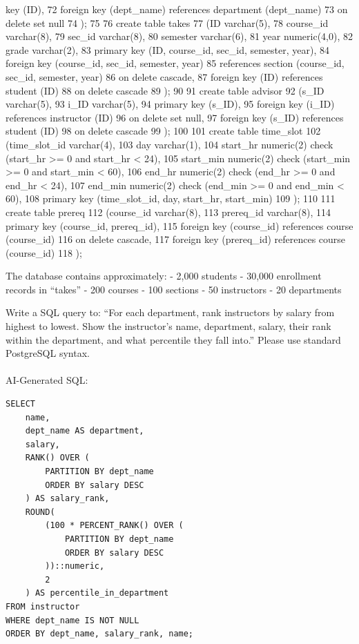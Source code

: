 \documentclass[
  letterpaper,
  DIV=11,
  numbers=noendperiod]{scrartcl}
\makeatletter
\let\oldparagraph\paragraph
\renewcommand{\paragraph}{
    \@ifstar
      \xxxParagraphStar
      \xxxParagraphNoStar
  }
\newcommand{\xxxParagraphStar}[1]{\oldparagraph*{#1}\mbox{}}
\newcommand{\xxxParagraphNoStar}[1]{\oldparagraph{#1}\mbox{}}
\makeatother
\begin{document}
key (ID), 72 foreign key (dept\_name) references department (dept\_name)
73 on delete set null 74 ); 75 76 create table takes 77 (ID varchar(5),
78 course\_id varchar(8), 79 sec\_id varchar(8), 80 semester varchar(6),
81 year numeric(4,0), 82 grade varchar(2), 83 primary key (ID,
course\_id, sec\_id, semester, year), 84 foreign key (course\_id,
sec\_id, semester, year) 85 references section (course\_id, sec\_id,
semester, year) 86 on delete cascade, 87 foreign key (ID) references
student (ID) 88 on delete cascade 89 ); 90 91 create table advisor 92
(s\_ID varchar(5), 93 i\_ID varchar(5), 94 primary key (s\_ID), 95
foreign key (i\_ID) references instructor (ID) 96 on delete set null, 97
foreign key (s\_ID) references student (ID) 98 on delete cascade 99 );
100 101 create table time\_slot 102 (time\_slot\_id varchar(4), 103 day
varchar(1), 104 start\_hr numeric(2) check (start\_hr \textgreater= 0
and start\_hr \textless{} 24), 105 start\_min numeric(2) check
(start\_min \textgreater= 0 and start\_min \textless{} 60), 106 end\_hr
numeric(2) check (end\_hr \textgreater= 0 and end\_hr \textless{} 24),
107 end\_min numeric(2) check (end\_min \textgreater= 0 and end\_min
\textless{} 60), 108 primary key (time\_slot\_id, day, start\_hr,
start\_min) 109 ); 110 111 create table prereq 112 (course\_id
varchar(8), 113 prereq\_id varchar(8), 114 primary key (course\_id,
prereq\_id), 115 foreign key (course\_id) references course (course\_id)
116 on delete cascade, 117 foreign key (prereq\_id) references course
(course\_id) 118 );

The database contains approximately: - 2,000 students - 30,000
enrollment records in ``takes'' - 200 courses - 100 sections - 50
instructors - 20 departments

Write a SQL query to: ``For each department, rank instructors by salary
from highest to lowest. Show the instructor's name, department, salary,
their rank within the department, and what percentile they fall into.''
Please use standard PostgreSQL syntax.

\paragraph{AI-Generated SQL:}\label{ai-generated-sql-3}

\begin{verbatim}
SELECT
    name,
    dept_name AS department,
    salary,
    RANK() OVER (
        PARTITION BY dept_name
        ORDER BY salary DESC
    ) AS salary_rank,
    ROUND(
        (100 * PERCENT_RANK() OVER (
            PARTITION BY dept_name
            ORDER BY salary DESC
        ))::numeric,
        2
    ) AS percentile_in_department
FROM instructor
WHERE dept_name IS NOT NULL
ORDER BY dept_name, salary_rank, name;
\end{verbatim}
\end{document}
